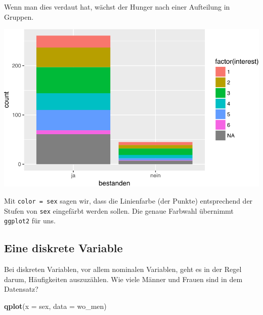 \documentclass[12pt,]{book}
\newenvironment{Shaded}{\begin{snugshade}}{\end{snugshade}}
\newcommand{\KeywordTok}[1]{\textcolor[rgb]{0.13,0.29,0.53}{\textbf{{#1}}}}
\newcommand{\DataTypeTok}[1]{\textcolor[rgb]{0.13,0.29,0.53}{{#1}}}
\newcommand{\DecValTok}[1]{\textcolor[rgb]{0.00,0.00,0.81}{{#1}}}
\newcommand{\StringTok}[1]{\textcolor[rgb]{0.31,0.60,0.02}{{#1}}}
\newcommand{\NormalTok}[1]{{#1}}
\begin{document}
Wenn man dies verdaut hat, wächst der Hunger nach einer Aufteilung in
Gruppen.

\begin{Shaded}
\end{Shaded}

\begin{center}\includegraphics[width=0.7\linewidth]{050_Daten_visualisieren_files/figure-latex/unnamed-chunk-19-1} \end{center}

Mit \texttt{color\ =\ sex} sagen wir, dass die Linienfarbe (der Punkte)
entsprechend der Stufen von \texttt{sex} eingefärbt werden sollen. Die
genaue Farbwahl übernimmt \texttt{ggplot2} für uns.

\subsection{Eine diskrete Variable}\label{eine-diskrete-variable}

Bei diskreten Variablen, vor allem nominalen Variablen, geht es in der
Regel darum, Häufigkeiten auszuzählen. Wie viele Männer und Frauen sind
in dem Datensatz?

\begin{Shaded}
\begin{Highlighting}[]
\KeywordTok{qplot}\NormalTok{(}\DataTypeTok{x =} \NormalTok{sex, }\DataTypeTok{data =} \NormalTok{wo_men)}
\end{Highlighting}
\end{Shaded}
\end{document}
